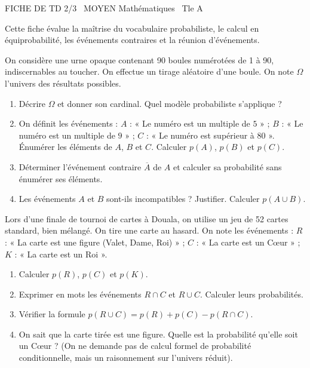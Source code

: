 \documentclass[11pt]{article}
\begin{document}
\begin{tcolorbox}[enhanced,colback=popink,colframe=popink,arc=10pt,boxrule=0pt,left=12pt,right=12pt,top=9pt,bottom=9pt]
{\color{white}\popxbold\small FICHE DE TD 2/3 \textbullet\ MOYEN \hfill Mathématiques \textbullet\ Tle A\par}
\end{tcolorbox}
\vspace{4pt}
\noindent Cette fiche évalue la maîtrise du vocabulaire probabiliste, le calcul en équiprobabilité, les événements contraires et la réunion d'événements.

\begin{exercice}
On considère une urne opaque contenant \num{90} boules numérotées de \num{1} à \num{90}, indiscernables au toucher. On effectue un tirage aléatoire d'une boule. On note $\Omega$ l'univers des résultats possibles.
\begin{enumerate}
    \item Décrire $\Omega$ et donner son cardinal. Quel modèle probabiliste s'applique ?
    \item On définit les événements : $A$ : « Le numéro est un multiple de $5$ » ; $B$ : « Le numéro est un multiple de $9$ » ; $C$ : « Le numéro est supérieur à $80$ ».
    Énumérer les éléments de $A$, $B$ et $C$. Calculer $p(A)$, $p(B)$ et $p(C)$.
    \item Déterminer l'événement contraire $\overline{A}$ de $A$ et calculer sa probabilité sans énumérer ses éléments.
    \item Les événements $A$ et $B$ sont-ils incompatibles ? Justifier. Calculer $p(A \cup B)$.
\end{enumerate}
\end{exercice}

\begin{exercice}
Lors d'une finale de tournoi de cartes à Douala, on utilise un jeu de \num{52} cartes standard, bien mélangé. On tire une carte au hasard. On note les événements :
$R$ : « La carte est une figure (Valet, Dame, Roi) » ; $C$ : « La carte est un Cœur » ; $K$ : « La carte est un Roi ».
\begin{enumerate}
    \item Calculer $p(R)$, $p(C)$ et $p(K)$.
    \item Exprimer en mots les événements $R \cap C$ et $R \cup C$. Calculer leurs probabilités.
    \item Vérifier la formule $p(R \cup C) = p(R) + p(C) - p(R \cap C)$.
    \item On sait que la carte tirée est une figure. Quelle est la probabilité qu'elle soit un Cœur ? (On ne demande pas de calcul formel de probabilité conditionnelle, mais un raisonnement sur l'univers réduit).
\end{enumerate}
\end{exercice}
\end{document}

